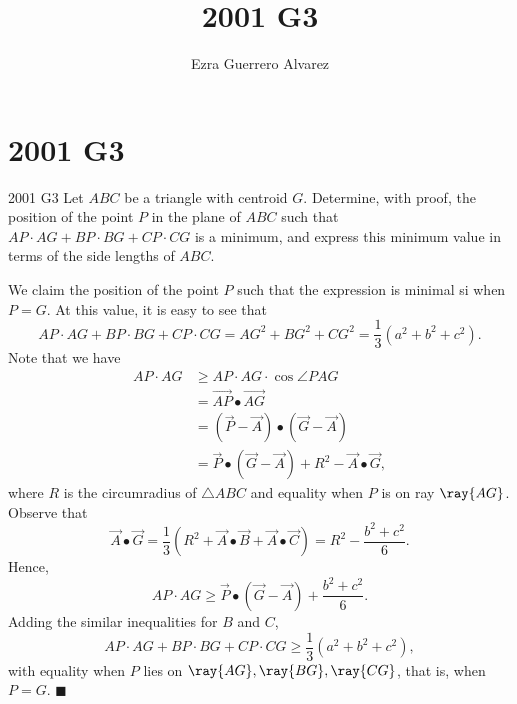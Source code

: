 \documentclass[14pt]{article}
\title{2001 G3}
\author{Ezra Guerrero Alvarez}
\begin{document}
\maketitle
	
\section*{2001 G3}

\begin{statement}{2001 G3}
	Let $ABC$ be a triangle with centroid $G$. Determine, with proof, the position of the point $P$ in the plane of $ABC$ such that $AP{\cdot}AG + BP{\cdot}BG + CP{\cdot}CG$ is a minimum, and express this minimum value in terms of the side lengths of $ABC$.
\end{statement}
We claim the position of the point $P$ such that the expression is minimal si when $P=G$. At this value, it is easy to see that
\[ AP{\cdot}AG + BP{\cdot}BG + CP{\cdot}CG = AG^2+BG^2+CG^2=\frac13(a^2+b^2+c^2). \]
Note that we have
\begin{align*}
	AP\cdot AG&\ge AP\cdot AG\cdot\cos{\angle PAG}\\
	&=\vec{AP}\bullet\vec{AG}\\
	&=(\vec P-\vec A)\bullet(\vec G-\vec A)\\
	&= \vec P\bullet(\vec G-\vec A)+R^2-\vec A\bullet \vec G,
\end{align*}
where $R$ is the circumradius of $\triangle ABC$ and equality when $P$ is on ray $\ray{AG}$. Observe that
\[ \vec A\bullet \vec G = \frac13(R^2+\vec A\bullet \vec B+\vec A \bullet \vec C) = R^2-\frac{b^2+c^2}6. \]
Hence,
\[ AP\cdot AG\ge \vec P\bullet(\vec G-\vec A)+\frac{b^2+c^2}6.  \]
Adding the similar inequalities for $B$ and $C$,
\[ AP\cdot AG + BP\cdot BG + CP\cdot CG \ge \frac13(a^2+b^2+c^2), \]
with equality when $P$ lies on $\ray{AG},\ray{BG},\ray{CG}$, that is, when $P=G$. $\blacksquare$
	
\end{document}
